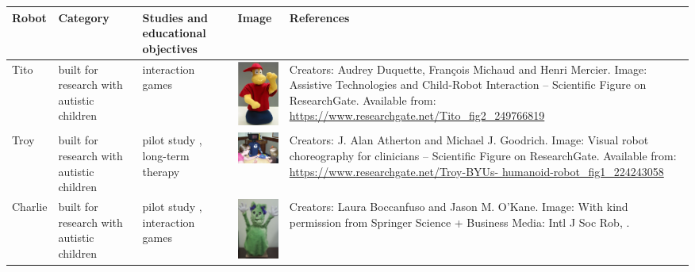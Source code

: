 
  \begin{longtable}
      {L{1.5 cm}  L{2.25cm}  L{3cm}  L{2.25cm}  L{2.75cm}} \hline Robot &  Category & Studies and educational objectives & Image & References \\
      \hline
      \centering
      
      
      Tito & built for research with autistic children & interaction games \cite{duquette2008exploring}  & \parbox[c]{1em}{\vspace{0.1cm}\includegraphics[width=1in]{images/Tito.png}
      \vspace{0.1cm}} & 
      \scriptsize{Creators: Audrey Duquette, François Michaud and Henri Mercier. Image: Assistive Technologies and Child-Robot Interaction – Scientific Figure on ResearchGate. Available from: \url{https://www.researchgate.net/Tito_fig2_249766819}}\\
      
     
      
      Troy & built for research with autistic children & pilot study \cite{giullian2010detailed}, long-term therapy \cite{goodrich2012incorporating}  & \parbox[c]{1em}{\includegraphics[width=1in]{images/Troy-BYUs-humanoid-robot.png}
      \vspace{0.1cm}} & 
      \scriptsize{Creators: J. Alan Atherton and Michael J. Goodrich. Image: Visual robot choreography for clinicians – Scientific Figure on ResearchGate. Available from: \url{https://www.researchgate.net/Troy-BYUs- humanoid-robot_fig1_224243058}}\\

      Charlie  & built for research with autistic children & pilot study \cite{charlie2011}, interaction games \cite{boccanfuso2017low} & 
      \parbox[c]{1em}{\includegraphics[width=1in]{images/charlie.png}\vspace{0.1cm}} & \scriptsize{Creators: Laura Boccanfuso and Jason M. O'Kane. Image: With kind permission from Springer Science + Business Media: Intl J Soc Rob, \cite{charlie2011}.} \\
      

\end{longtable}

